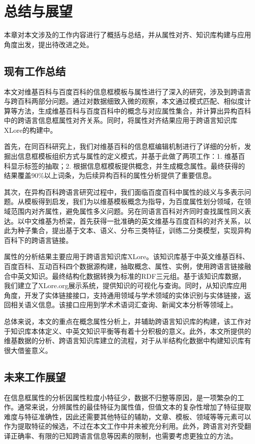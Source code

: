\chapter{总结与展望}
\label{cha:conclusion}
本章对本文涉及的工作内容进行了概括与总结，并从属性对齐、知识库构建与应用角度出发，提出待改进之处。

\section{现有工作总结}
本文对维基百科与百度百科的信息框模板与属性进行了深入的研究，涉及到跨语言与跨百科两部分问题。通过对数据细致入微的观察，本文通过模式匹配、相似度计算等方法，生成维基百科与百度百科中的概念与对应属性集合，并计算出异构百科中的跨语言信息框属性对齐关系。同时，将属性对齐结果应用于跨语言知识库XLore的构建中。

首先，在同百科研究上，我们对维基百科的信息框编辑机制进行了详细的分析，发掘出信息框模板组织方式与属性的定义模式，并基于此做了两项工作：1. 维基百科显示标签的抽取；2. 根据信息框模板提供概念，并生成概念属性。最终获得的结果覆盖90\%以上词条，为后续异构百科的属性分析提供了重要信息。

其次，在异构百科跨语言研究过程中，我们面临百度百科中属性的歧义与多表示问题。从模板得到启发，我们为以维基模板概念为指导，为百度属性划分领域，在领域范围内对齐属性，避免属性多义问题。另在同语言百科对齐同时查找属性同义表达。以中文维基为桥梁，首先获得一批准确的英文维基与百度百科的对齐关系，以此为种子集合，提出基于文本、语义、分布三类特征，训练二分类模型，实现异构百科下的跨语言链接。

属性的分析结果主要应用于跨语言知识库XLore。该知识库基于中英文维基百科、百度百科、互动百科四个数据源构建，抽取概念、属性、实例，使用跨语言链接融合中英文知识。最终结构化数据转换为标准的RDF三元组。基于该知识库数据，我们建立了XLore.org展示系统，提供知识的可视化与查询。同时，从知识库应用角度，开发了实体链接接口，支持通用领域与学术领域的实体识别与实体链接，返回相关语义信息。该接口应用到学术术语词汇查询、新闻文本分析等领域上。

总体来说，本文的重点在概念属性分析上，并辅助跨语言知识库的构建，该工作对于知识库本体定义、中英文知识平衡等有着十分积极的意义。此外，本文所提供的维基数据的分析、跨语言知识库建立的流程，对于从半结构化数据中构建知识库有很大借鉴意义。

\section{未来工作展望}
在信息框属性的分析因属性粒度小特征少，数据不归整等原因，是一项繁杂的工作。通常来说，分辨属性的最佳特征为属性值，但值文本的复杂性增加了特征提取难度与特征准确性，因此还需要其他特征的辅助，文章、模板、领域等等元素可以作为提取特征的候选，不过在本文工作中并未被充分利用。此外，跨语言对齐受翻译正确率、有限的已知跨语言信息等因素的限制，也需要考虑更独立的方法。

